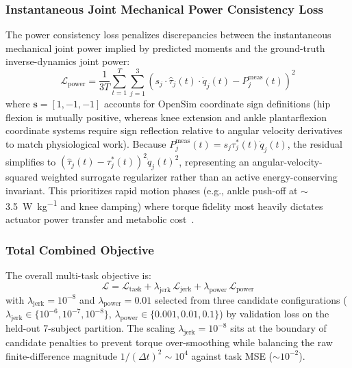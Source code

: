 \documentclass[journal]{IEEEtran}
\newcommand{\dotq}{\dot{q}}
\newcommand{\lamjerk}{\lambda_{\mathrm{jerk}}}
\newcommand{\lampower}{\lambda_{\mathrm{power}}}
\newcommand{\Wkg}{\si{\watt\per\kilogram}}
\begin{document}
\subsubsection{Instantaneous Joint Mechanical Power Consistency Loss}
The power consistency loss penalizes discrepancies between the instantaneous mechanical joint power implied by predicted moments and the ground-truth inverse-dynamics joint power:
\begin{equation}
    \mathcal{L}_{\mathrm{power}} = \frac{1}{3T} \sum_{t=1}^{T} \sum_{j=1}^{3} \left( s_j \cdot \hat{\tau}_j(t) \cdot \dotq_j(t) - P_j^{\mathrm{meas}}(t) \right)^2
    \label{eq:loss_power}
\end{equation}
where $\mathbf{s} = [1, -1, -1]$ accounts for OpenSim coordinate sign definitions (hip flexion is mutually positive, whereas knee extension and ankle plantarflexion coordinate systems require sign reflection relative to angular velocity derivatives to match physiological work). Because $P_j^{\mathrm{meas}}(t) = s_j \tau_j^*(t) \dotq_j(t)$, the residual simplifies to $(\hat{\tau}_j(t) - \tau_j^*(t))^2 \dotq_j(t)^2$, representing an angular-velocity-squared weighted surrogate regularizer rather than an active energy-conserving invariant. This prioritizes rapid motion phases (e.g., ankle push-off at $\sim$3.5~\Wkg{} and knee damping) where torque fidelity most heavily dictates actuator power transfer and metabolic cost~\cite{winter2009biomechanics}.

\subsubsection{Total Combined Objective}
The overall multi-task objective is:
\begin{equation}
    \mathcal{L} = \mathcal{L}_{\mathrm{task}} + \lamjerk \, \mathcal{L}_{\mathrm{jerk}} + \lampower \, \mathcal{L}_{\mathrm{power}}
    \label{eq:loss_total}
\end{equation}
with $\lamjerk = 10^{-8}$ and $\lampower = 0.01$ selected from three candidate configurations ($\lambda_{\mathrm{jerk}} \in \{10^{-6}, 10^{-7}, 10^{-8}\}$, $\lambda_{\mathrm{power}} \in \{0.001, 0.01, 0.1\}$) by validation loss on the held-out 7-subject partition. The scaling $\lamjerk = 10^{-8}$ sits at the boundary of candidate penalties to prevent torque over-smoothing while balancing the raw finite-difference magnitude $1/(\Delta t)^2 \sim 10^4$ against task MSE ($\sim 10^{-2}$).

\end{document}
